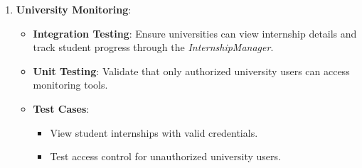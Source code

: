 \begin{enumerate}
        \item \textbf{University Monitoring}:
        \begin{itemize}
            \item \textbf{Integration Testing}: 
            Ensure universities can view internship details and track student progress through the \textit{InternshipManager}.
            \item \textbf{Unit Testing}: 
            Validate that only authorized university users can access monitoring tools.
            \item \textbf{Test Cases}:
            \begin{itemize}
                \item View student internships with valid credentials.
                \item Test access control for unauthorized university users.
            \end{itemize}
        \end{itemize}
    \end{enumerate}
